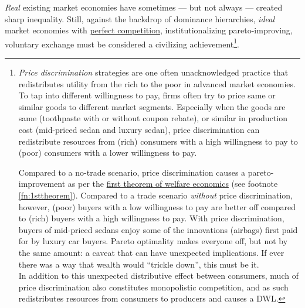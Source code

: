 \emph{Real} existing market economies have sometimes --- but not always --- created sharp inequality.
Still, against the backdrop of dominance hierarchies, \emph{ideal} market economies with \hyperref[fn:perfect-competition]{perfect competition}, institutionalizing pareto-improving, voluntary exchange must be considered a civilizing achievement\footnote{
	\emph{Price discrimination} strategies are one often unacknowledged practice that redistributes utility from the rich to the poor in advanced market economies.
	To tap into different willingness to pay, firms often try to price same or similar goods to different market segments.
	Especially when the goods are same (toothpaste with or without coupon rebate), or similar in production cost (mid-priced sedan and luxury sedan), price discrimination can redistribute resources from (rich) consumers with a high willingness to pay to (poor) consumers with a lower willingness to pay.


	Compared to a no-trade scenario, price discrimination causes a pareto-improvement as per the \hyperref[fn:1sttheorem]{first theorem of welfare economics} (see footnote \ref{fn:1sttheorem}). Compared to a trade scenario \emph{without} price discrimination, however, (poor) buyers with a low willingness to pay are better off compared to (rich) buyers with a high willingness to pay. With price discrimination, buyers of mid-priced sedans enjoy some of the innovations (airbags) first paid for by luxury car buyers. Pareto optimality makes everyone off, but not by the same amount: a caveat that can have unexpected implications. If ever there was a way that wealth would ``trickle down'', this must be it.\\
	In addition to this unexpected distributive effect between consumers, much of price discrimination also constitutes monopolistic competition, and as such redistributes resources from consumers to producers and causes a \gls{DWL}.}.%

